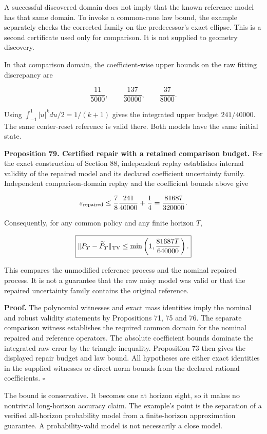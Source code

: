 \documentclass[11pt,letterpaper]{article}
\begin{document}
A successful discovered domain does not imply that the known reference
model has that same domain. To invoke a common-cone law bound, the
example separately checks the corrected family on the predecessor's
exact ellipse. This is a second certificate used only for comparison. It
is not supplied to geometry discovery.

In that comparison domain, the coefficient-wise upper bounds on the raw
fitting discrepancy are

\[
\frac{11}{5000},\qquad \frac{137}{30000},\qquad \frac{37}{8000}.
\]

Using \(\int_{-1}^1|u|^kdu/2=1/(k+1)\) gives the integrated upper budget
\(241/40000\). The same center-reset reference is valid there. Both
models have the same initial state.

\textbf{Proposition 79. Certified repair with a retained comparison
budget.} For the exact construction of Section 88, independent replay
establishes internal validity of the repaired model and its declared
coefficient uncertainty family. Independent comparison-domain replay and
the coefficient bounds above give

\[
\varepsilon_{\rm repaired}
\leq\frac78\frac{241}{40000}+\frac14
=\frac{81687}{320000}.
\]

Consequently, for any common policy and any finite horizon \(T\),

\[
\boxed{
\|P_T-\widetilde P_T\|_{\rm TV}
\leq\min\left(1,\frac{81687T}{640000}\right).
}
\]

This compares the unmodified reference process and the nominal repaired
process. It is not a guarantee that the raw noisy model was valid or
that the repaired uncertainty family contains the original reference.

\textbf{Proof.} The polynomial witnesses and exact mass identities imply
the nominal and robust validity statements by Propositions 71, 75 and
76. The separate comparison witness establishes the required common
domain for the nominal repaired and reference operators. The absolute
coefficient bounds dominate the integrated raw error by the triangle
inequality. Proposition 73 then gives the displayed repair budget and
law bound. All hypotheses are either exact identities in the supplied
witnesses or direct norm bounds from the declared rational coefficients.
\(\square\)

The bound is conservative. It becomes one at horizon eight, so it makes
no nontrivial long-horizon accuracy claim. The example's point is the
separation of a verified all-horizon probability model from a
finite-horizon approximation guarantee. A probability-valid model is not
necessarily a close model.
\end{document}
